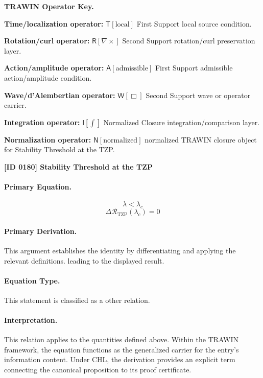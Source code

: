 \par\vspace{0.45\baselineskip}
\noindent\begin{minipage}[t]{\linewidth}
\begingroup
\small
\raggedright
\textbf{TRAWIN Operator Key.}\par
\noindent\textbf{Time/localization operator:} $\mathsf{T}\!\left[\mathrm{local}\right]$ First Support local source condition.\par
\noindent\textbf{Rotation/curl operator:} $\mathsf{R}\!\left[\nabla\times\right]$ Second Support rotation/curl preservation layer.\par
\noindent\textbf{Action/amplitude operator:} $\mathsf{A}\!\left[\mathrm{admissible}\right]$ First Support admissible action/amplitude condition.\par
\noindent\textbf{Wave/d'Alembertian operator:} $\mathsf{W}\!\left[\Box\right]$ Second Support wave or operator carrier.\par
\noindent\textbf{Integration operator:} $\mathsf{I}\!\left[\int\right]$ Normalized Closure integration/comparison layer.\par
\noindent\textbf{Normalization operator:} $\mathsf{N}\!\left[\mathrm{normalized}\right]$ normalized TRAWIN closure object for Stability Threshold at the TZP.\par
\endgroup
\end{minipage}

\clearpage
\noindent\textbf{[ID 0180] Stability Threshold at the TZP}\par
\vspace{0.35em}
\paragraph{Primary Equation.}
\[
\lambda < \lambda_c
\]
\[
\Delta \mathcal{R}_{\mathrm{TZP}}(\lambda_c)=0
\]

\paragraph{Primary Derivation.}
This argument establishes the identity by differentiating and applying the relevant definitions. leading to the displayed result.
\paragraph{Equation Type.}
This statement is classified as a other relation.

\paragraph{Interpretation.}
This relation applies to the quantities defined above. Within the TRAWIN framework, the equation functions as the generalized carrier for the entry’s information content. Under CHL, the derivation provides an explicit term connecting the canonical proposition to its proof certificate.

